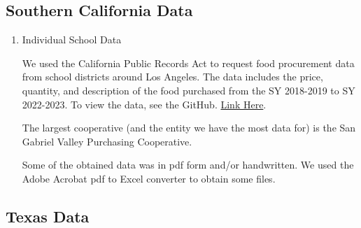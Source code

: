 \documentclass[12pt]{article}
\begin{document}
\subsection{Southern California Data}

\begin{enumerate}
	\item Individual School Data
	
	We used the California Public Records Act to request food procurement data from school districts around Los Angeles. The data includes the price, quantity, and description of the food purchased from the SY 2018-2019 to SY 2022-2023. To view the data, see the GitHub. \href{https://github.com/darionphan/obesitydata/tree/main}{Link Here}.
	
	The largest cooperative (and the entity we have the most data for) is the San Gabriel Valley Purchasing Cooperative. 
	
	Some of the obtained data was in pdf form and/or handwritten. We used the Adobe Acrobat pdf to Excel converter to obtain some files.
	
\end{enumerate}

\subsection{Texas Data}
\end{document}
